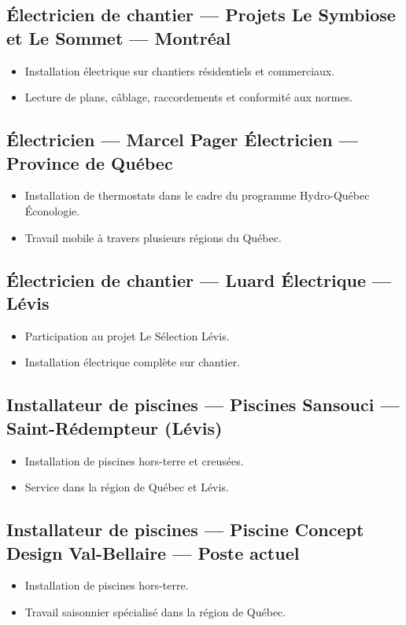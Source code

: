 \documentclass[11pt,a4paper]{article}
\begin{document}
\subsection*{Électricien de chantier — Projets Le Symbiose et Le Sommet — Montréal}
\begin{itemize}
    \item Installation électrique sur chantiers résidentiels et commerciaux.
    \item Lecture de plans, câblage, raccordements et conformité aux normes.
\end{itemize}

\subsection*{Électricien — Marcel Pager Électricien — Province de Québec}
\begin{itemize}
    \item Installation de thermostats dans le cadre du programme Hydro-Québec Éconologie.
    \item Travail mobile à travers plusieurs régions du Québec.
\end{itemize}

\subsection*{Électricien de chantier — Luard Électrique — Lévis}
\begin{itemize}
    \item Participation au projet Le Sélection Lévis.
    \item Installation électrique complète sur chantier.
\end{itemize}

\subsection*{Installateur de piscines — Piscines Sansouci — Saint-Rédempteur (Lévis)}
\begin{itemize}
    \item Installation de piscines hors-terre et creusées.
    \item Service dans la région de Québec et Lévis.
\end{itemize}

\subsection*{Installateur de piscines — Piscine Concept Design Val-Bellaire — Poste actuel}
\begin{itemize}
    \item Installation de piscines hors-terre.
    \item Travail saisonnier spécialisé dans la région de Québec.
\end{itemize}
\end{document}
